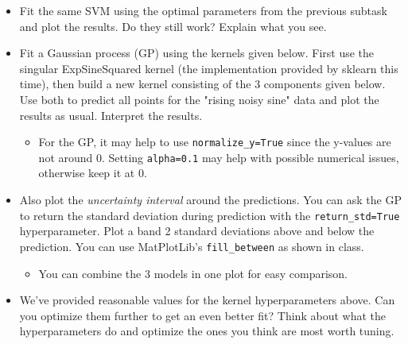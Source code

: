 \documentclass[11pt]{article}
\providecommand{\tightlist}{%
      \setlength{\itemsep}{0pt}\setlength{\parskip}{0pt}}
\begin{document}
\begin{itemize}
\tightlist
\item
  Fit the same SVM using the optimal parameters from the previous
  subtask and plot the results. Do they still work? Explain what you
  see.
\item
  Fit a Gaussian process (GP) using the kernels given below. First use
  the singular ExpSineSquared kernel (the implementation provided by
  sklearn this time), then build a new kernel consisting of the 3
  components given below. Use both to predict all points for the "rising
  noisy sine" data and plot the results as usual. Interpret the results.

  \begin{itemize}
  \tightlist
  \item
    For the GP, it may help to use \texttt{normalize\_y=True} since the
    y-values are not around 0. Setting \texttt{alpha=0.1} may help with
    possible numerical issues, otherwise keep it at 0.
  \end{itemize}
\item
  Also plot the \emph{uncertainty interval} around the predictions. You
  can ask the GP to return the standard deviation during prediction with
  the \texttt{return\_std=True} hyperparameter. Plot a band 2 standard
  deviations above and below the prediction. You can use MatPlotLib's
  \texttt{fill\_between} as shown in class.

  \begin{itemize}
  \tightlist
  \item
    You can combine the 3 models in one plot for easy comparison.
  \end{itemize}
\item
  We've provided reasonable values for the kernel hyperparameters above.
  Can you optimize them further to get an even better fit? Think about
  what the hyperparameters do and optimize the ones you think are most
  worth tuning.
\end{itemize}
\end{document}
